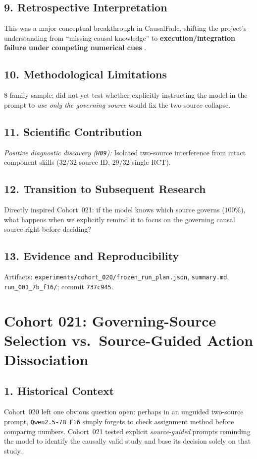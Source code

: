 \subsection*{9. Retrospective Interpretation}
This was a major conceptual breakthrough in CausalFade, shifting the project's understanding from ``missing causal knowledge'' to \textbf{execution/integration failure under competing numerical cues} \citep{chen2026acedbench,zhang2026epistemic}.

\subsection*{10. Methodological Limitations}
$8$-family sample; did not yet test whether explicitly instructing the model in the prompt to \emph{use only the governing source} would fix the two-source collapse.

\subsection*{11. Scientific Contribution}
\emph{Positive diagnostic discovery (\texttt{H09}):} Isolated two-source interference from intact component skills ($32/32$ source ID, $29/32$ single-RCT).

\subsection*{12. Transition to Subsequent Research}
Directly inspired Cohort~021: if the model knows which source governs ($100\%$), what happens when we explicitly remind it to focus on the governing causal source right before deciding?

\subsection*{13. Evidence and Reproducibility}
Artifacts: \texttt{experiments/cohort\_020/frozen\_run\_plan.json}, \texttt{summary.md}, \texttt{run\_001\_7b\_f16/}; commit \texttt{737c945}.

\section{Cohort 021: Governing-Source Selection vs.\ Source-Guided Action Dissociation}

\subsection*{1. Historical Context}
Cohort~020 left one obvious question open: perhaps in an unguided two-source prompt, \texttt{Qwen2.5-7B F16} simply forgets to check assignment method before comparing numbers. Cohort~021 tested explicit \emph{source-guided} prompts reminding the model to identify the causally valid study and base its decision solely on that study.


